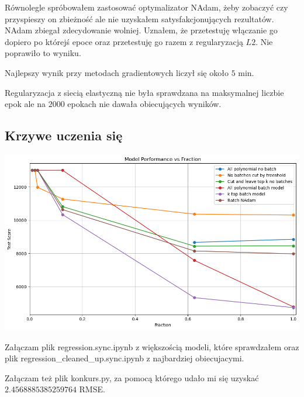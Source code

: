 \documentclass{article}
\begin{document}
  Równolegle spróbowałem zastosować optymalizator NAdam, żeby zobaczyć czy przyspieszy on zbieżność ale nie uzyskałem satysfakcjonujących rezultatów. 
  NAdam zbiegał zdecydowanie wolniej.
  Uznałem, że przetestuję włączanie go dopiero po którejś epoce oraz przetestuję go razem z regularyzacją $L{2}$. 
  Nie poprawiło to wyniku.


  \vspace{5pt}

  Najlepszy wynik przy metodach gradientowych liczył się około $5$ min.

  Regularyzacja z siecią elastyczną nie była sprawdzana na maksymalnej liczbie epok ale na $2000$ epokach nie dawała obiecujących wyników.

  \subsection{Krzywe uczenia się}

  \begin{center}
    \includegraphics[width = .8\linewidth]{Learning curves.png}
  \end{center}

  Załączam plik regression.sync.ipynb z większością modeli, które sprawdzałem oraz \\
  plik regression\_cleaned\_up.sync.ipynb z najbardziej obiecujacymi.

  Załączam też plik konkurs.py, za pomocą którego udało mi się uzyskać $
2.4568885385259764$ RMSE.
\end{document}
